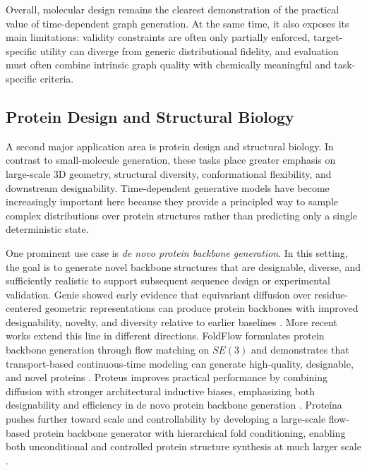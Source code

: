 \documentclass{article}
\begin{document}
Overall, molecular design remains the clearest demonstration of the practical value of time-dependent graph generation. At the same time, it also exposes its main limitations: validity constraints are often only partially enforced, target-specific utility can diverge from generic distributional fidelity, and evaluation must often combine intrinsic graph quality with chemically meaningful and task-specific criteria.

\subsection{Protein Design and Structural Biology}
\label{sec:app_protein}

A second major application area is protein design and structural biology. In contrast to small-molecule generation, these tasks place greater emphasis on large-scale 3D geometry, structural diversity, conformational flexibility, and downstream designability. Time-dependent generative models have become increasingly important here because they provide a principled way to sample complex distributions over protein structures rather than predicting only a single deterministic state.

One prominent use case is \emph{de novo protein backbone generation}. In this setting, the goal is to generate novel backbone structures that are designable, diverse, and sufficiently realistic to support subsequent sequence design or experimental validation. Genie showed early evidence that equivariant diffusion over residue-centered geometric representations can produce protein backbones with improved designability, novelty, and diversity relative to earlier baselines \cite{lin2023genie}. More recent works extend this line in different directions. FoldFlow formulates protein backbone generation through flow matching on $SE(3)$ and demonstrates that transport-based continuous-time modeling can generate high-quality, designable, and novel proteins \cite{bose2024foldflow}. Proteus improves practical performance by combining diffusion with stronger architectural inductive biases, emphasizing both designability and efficiency in de novo protein backbone generation \cite{wang2024proteus}. Prote\'ina pushes further toward scale and controllability by developing a large-scale flow-based protein backbone generator with hierarchical fold conditioning, enabling both unconditional and controlled protein structure synthesis at much larger scale \cite{geffner2025proteina}.
\end{document}
